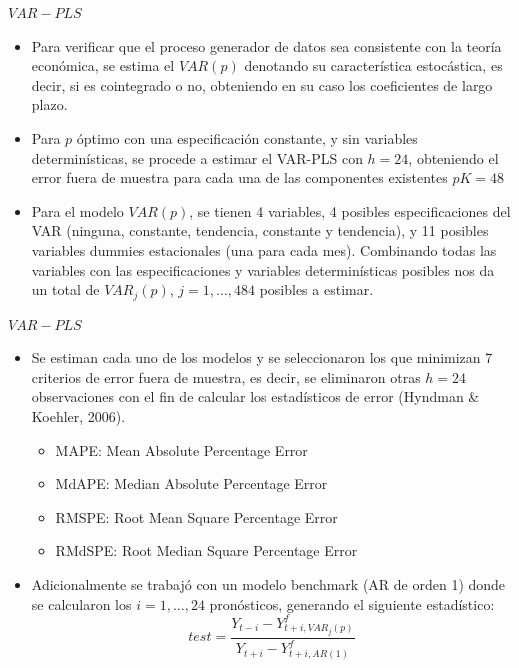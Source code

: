 \documentclass{beamer}
\newcommand{\?}{?`}
\begin{document}
\begin{frame}{$VAR-PLS$}
  \begin{itemize}
  \item Para verificar que el proceso generador de datos sea
    consistente con la teor\'ia econ\'omica, se estima el $VAR(p)$
    denotando su caracter\'istica estoc\'astica, es decir, si es
    cointegrado o no, obteniendo en su caso los coeficientes de largo
    plazo.
  \item Para $p$ \'optimo con una especificaci\'on constante, y sin
    variables determin\'isticas, se procede a estimar el VAR-PLS con
    $h=24$, obteniendo el error fuera de muestra para cada una de las
    componentes existentes $pK=48$
  \item Para el modelo $VAR(p)$, se tienen 4 variables, 4 posibles
    especificaciones del VAR (ninguna, constante, tendencia, constante
    y tendencia), y 11 posibles variables dummies estacionales (una
    para cada mes). Combinando todas las variables con las
    especificaciones y variables determin\'isticas posibles nos da un
    total de $VAR_j(p)$, $j=1,\ldots,484$ posibles a estimar.
  \end{itemize}

\end{frame}

\begin{frame}{$VAR-PLS$}
  \begin{itemize}
  \item Se estiman cada uno de los modelos y se seleccionaron los que
    minimizan 7 criterios de error fuera de muestra, es decir, se
    eliminaron otras $h=24$ observaciones con el fin de calcular los
    estad\'isticos de error (Hyndman \& Koehler, 2006).
    \begin{itemize}
    \item MAPE: Mean Absolute Percentage Error
    \item MdAPE: Median Absolute Percentage Error
    \item RMSPE: Root Mean Square Percentage Error
    \item RMdSPE: Root Median Square Percentage Error
    \end{itemize}
  \item Adicionalmente se trabaj\'o con un modelo benchmark (AR de
    orden 1) donde se calcularon los $i=1,\ldots,24$ pron\'osticos,
    generando el siguiente estad\'istico:
    \begin{displaymath}
      test=\frac{Y_{t-i}-Y_{t+i,VAR_j(p)}^f}{Y_{t+i}-Y_{t+i,AR(1)}^f}
    \end{displaymath}

  \end{itemize}
\end{frame}
\end{document}
